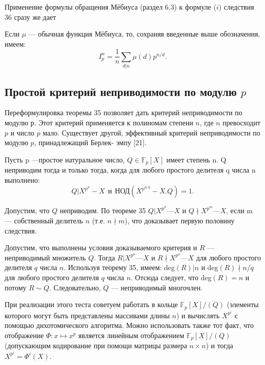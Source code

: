 \documentclass{mai_book}
\begin{document}
Применение формулы обращения Мёбиуса (раздел 6.3) к формуле 
($i$) следствия 36 сразу же дает 

\begin{sled}
\hspace*{0.5cm}Если $\mu$ — обычная функция Мёбиуса, то, сохраняя введенные выше 
обозначения, имеем: 
\begin{equation*}
I^n_p = \frac{1}{n}\sum_{d|n}\mu(d)p^{n \slash d}.
\end{equation*}
\end{sled}
\newpage

\subsection{Простой критерий неприводимости по модулю $p$}
Переформулировка теоремы 35 позволяет дать критерий  
неприводимости по модулю $р$. Этот критерий применяется к полиномам степени 
$n$, где $n$ превосходит $p$ и число $p$ мало. Существует другой,  
эффективный критерий неприводимости по модулю $p$, принадлежащий Берлек- 
эмпу [21]. \newline\newline
\begin{sled}
\hspace*{0.5cm}Пусть p —простое натуральное число, $Q \in \mathbb{F}_p [X]$ имеет степень n. Q 
неприводим тогда и только тогда, когда для любого простого делителя 
q числа n выполнено: 
\begin{equation*}
Q|X^{p^n} - X\:\: \textit{и} \:\: \text{НОД}(X^{p^{n\slash q}} - X.Q)=1.
\end{equation*}
\end{sled}

\begin{myproof}
Допустим, что $Q$ неприводим. По теореме 35 $Q | X^{p^n} — X$ и 
$Q \nmid X^{p^m} — X$, если m — собственный делитель $n$ (т.е. $n \nmid m$), что 
доказывает первую половину следствия.
 
\noindent Допустим, что выполнены условия доказываемого критерия и $R$ — 
неприводимый множитель $Q$. Тогда $R | X^{p^n} — X$ и $R \nmid X^{p^n} — X$ для 
любого простого делителя $q$ числа $n$. Используя теорему 35, имеем: 
deg$(R) | n$ и deg$(R) \nmid n \slash q$ для любого простого делителя $q$ числа $n$. 
Отсюда следует, что deg$(R) = n$ и потому $R \sim Q$. Следовательно, 
$Q$ — неприводимый многочлен.
\end{myproof}

\begin{mynotice}
При реализации этого теста советуем работать в 
кольце $\mathbb{F}_p[X]\slash(Q)$ (элементы которого могут быть представлены 
массивами длины $n$) и вычислять $X^{p^i}$ с помощью  
дихотомического алгоритма. Можно использовать также тот факт, что  
отображение $ \Phi: x \mapsto x^p$ является линейным отображением $\mathbb{F}_p[X]\slash(Q)$ 
(допускающим кодирование при помощи матрицы размера $n \times n$) 
и тогда $X^{p^i} = \Phi^i(X)$.\newline 
\end{mynotice}
\end{document}
